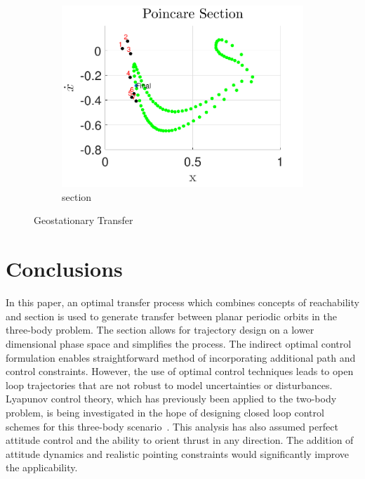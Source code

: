\documentclass[preprint]{elsarticle}
\begin{document}
\begin{figure}
	\begin{subfigure}[htbp]{0.5\textwidth} 
		\includegraphics[width=\textwidth]{poincare} 
		\caption{\Poincare section} \label{fig:geo_transfer_poincare} 
	\end{subfigure} 
	\caption{Geostationary Transfer}
	\label{fig:geo_transfer} 
\end{figure}

\section{Conclusions}\label{sec:conclusion}
In this paper, an optimal transfer process which combines concepts of reachability and \Poincare section is used to generate transfer between planar periodic orbits in the three-body problem.
The \Poincare section allows for trajectory design on a lower dimensional phase space and simplifies the process.
The indirect optimal control formulation enables straightforward method of incorporating additional path and control constraints.
However, the use of optimal control techniques leads to open loop trajectories that are not robust to model uncertainties or disturbances.
Lyapunov control theory, which has previously been applied to the two-body problem, is being investigated in the hope of designing closed loop control schemes for this three-body scenario~\cite{chang2002}.
This analysis has also assumed perfect attitude control and the ability to orient thrust in any direction.
The addition of attitude dynamics and realistic pointing constraints would significantly improve the applicability.

\appendix
\end{document}
